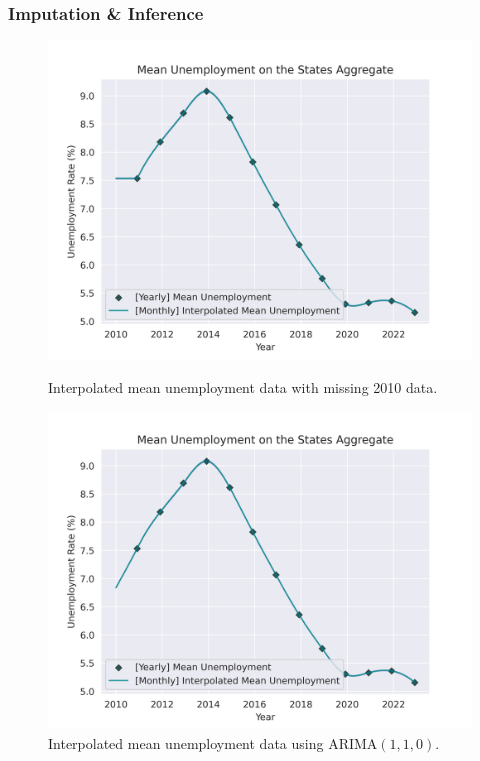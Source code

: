 \documentclass[12pt]{article}
\begin{document}
        \subsubsection{Imputation \& Inference}
        \begin{figure}
            \begin{minipage}{.5\textwidth}
                \centering
                \includegraphics[width=1\linewidth]{images/Unemployment Rates - Constant.png}
                \caption{Interpolated mean unemployment data with missing 2010 data.}
                \label{fig:1_monthly_unemployment_plateau}
            \end{minipage}
            \begin{minipage}{.5\textwidth}
                \centering
                \includegraphics[width=1\linewidth]{images/Unemployment Rates.png}
                \caption{Interpolated mean unemployment data using $\mathrm{ARIMA}(1,1,0)$.}
                \label{fig:2_monthly_unemployment}
            \end{minipage}
        \end{figure}
        
\end{document}
